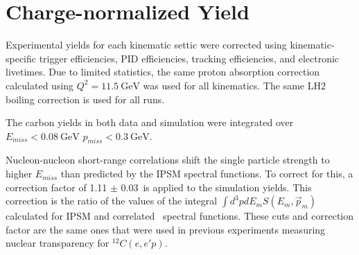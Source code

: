 \section{Charge-normalized Yield}
Experimental yields for each kinematic settic were corrected using
kinematic-specific trigger efficiencies, PID efficiencies, tracking
efficiencies, and electronic livetimes.
Due to limited statistics, the same proton absorption correction calculated
using $Q^2=\SI{11.5}{\giga\electronvolt}$ was used for all kinematics.
The same LH2 boiling correction is used for all runs.


The carbon yields in both data and simulation were integrated over
$E_{miss} < \SI{0.08}{\giga\electronvolt}$
$p_{miss} < \SI{0.3}{\giga\electronvolt}$.


Nucleon-nucleon short-range correlations shift the single particle strength
to higher $E_{miss}$ than predicted by the IPSM spectral functions.
To correct for this, a correction factor of 1.11 $\pm$ 0.03\,\cite{ONeill_1995}
is applied to the simulation yields.
This correction is the ratio of the values of the integral
$\int d^3p dE_m S(E_m,\vec{p}_m)$ 
calculated for IPSM and correlated~\cite{VanOrden_1980} spectral functions.
These cuts and correction factor are the same ones that were used in previous
experiments measuring nuclear transparency for ${}^{12}C(e,e'p)$.
